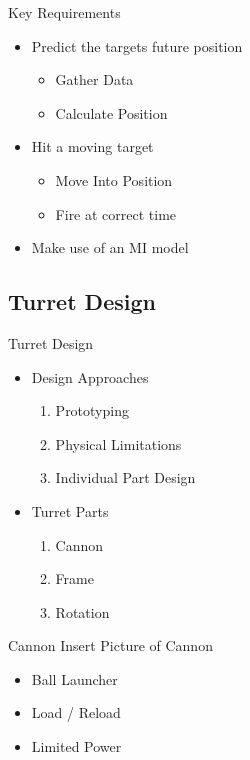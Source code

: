 \begin{frame}{Key Requirements}
\begin{itemize}
	\item Predict the targets future position
		\begin{itemize}
			\item Gather Data
			\item Calculate Position
		\end{itemize}
	\item Hit a moving target
		\begin{itemize}
			\item Move Into Position
			\item Fire at correct time
		\end{itemize}
	\item Make use of an MI model
\end{itemize}
\end{frame}

\subsection{Turret Design}
\begin{frame}{Turret Design}
\begin{itemize}
    \item Design Approaches
		\begin{enumerate}
  			\item Prototyping
  			\item Physical Limitations
  			\item Individual Part Design
		\end{enumerate} 
	\item Turret Parts
		\begin{enumerate}
  			\item Cannon
  			\item Frame
  			\item Rotation
		\end{enumerate}
\end{itemize}
\end{frame}

\begin{frame}{Cannon}
Insert Picture of Cannon
\begin{itemize}
	\item Ball Launcher
	\item Load / Reload
	\item Limited Power
\end{itemize}
\end{frame}

